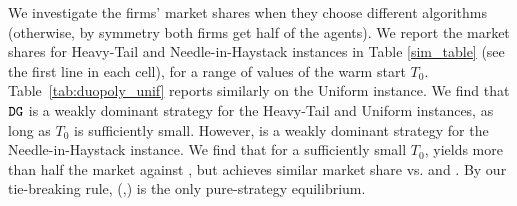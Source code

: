 \documentclass[../competing_bandits_with_appendix.tex]{subfiles}
\begin{document}


We investigate the firms' market shares when they choose different algorithms (otherwise, by symmetry both firms get half of the agents). We report the market shares for Heavy-Tail and Needle-in-Haystack instances in Table \ref{sim_table}  (see the first line in each cell), for a range of values of the warm start $T_0$. Table~\ref{tab:duopoly_unif} reports similarly on the Uniform instance. We find that $\mathtt{DG}$ is a weakly dominant strategy for the Heavy-Tail and Uniform instances, as long as $T_0$ is sufficiently small. However, \TS is a weakly dominant strategy for the Needle-in-Haystack instance. We find that for a sufficiently small $T_0$, \DG yields more than half the market against \TS,  but achieves similar market share vs. \DG and \DEG. By our tie-breaking rule, (\DG,\DG) is the only pure-strategy equilibrium.
\end{document}
